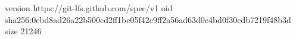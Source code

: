 version https://git-lfs.github.com/spec/v1
oid sha256:0ebd8ad26a22b500cd2ff1bc05f42e9ff2a56ad63d0e4bd0f30cdb7219f48b3d
size 21246
